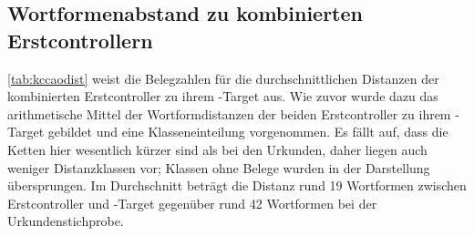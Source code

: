 \subsection{Wortformenabstand zu kombinierten Erstcontrollern}

\cref{tab:kccaodist} weist die Belegzahlen für die durchschnittlichen Distanzen
der kombinierten Erstcontroller zu ihrem -Target aus. Wie zuvor
wurde dazu das arithmetische Mittel der Wortformdistanzen der beiden
Erstcontroller zu ihrem -Target gebildet und eine
Klasseneinteilung vorgenommen. Es fällt auf, dass die Ketten hier wesentlich
kürzer sind als bei den Urkunden, daher liegen auch weniger Distanzklassen vor;
Klassen ohne Belege wurden in der Darstellung übersprungen. Im
Durchschnitt beträgt die Distanz rund 19 Wortformen zwischen Erstcontroller und
-Target gegenüber rund 42 Wortformen bei der Urkundenstichprobe.

